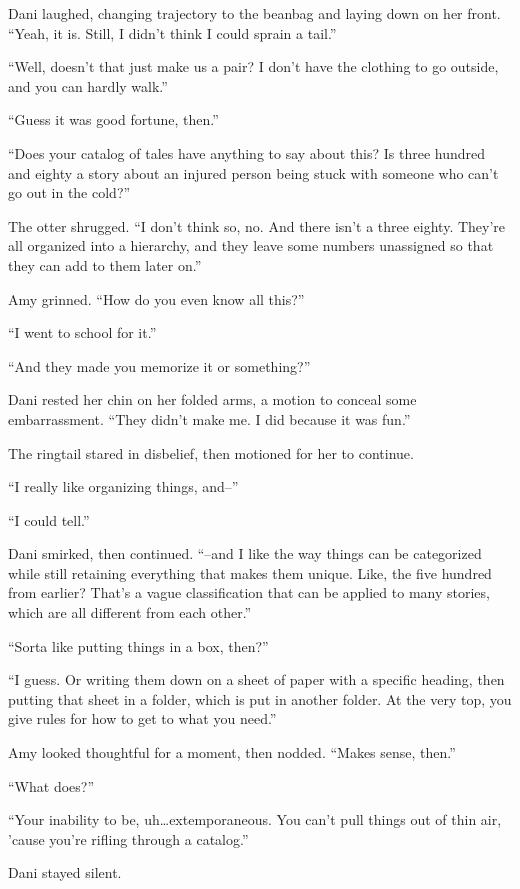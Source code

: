 Dani laughed, changing trajectory to the beanbag and laying down on her front. ``Yeah, it is. Still, I didn't think I could sprain a tail.''

``Well, doesn't that just make us a pair? I don't have the clothing to go outside, and you can hardly walk.''

``Guess it was good fortune, then.''

``Does your catalog of tales have anything to say about this? Is three hundred and eighty a story about an injured person being stuck with someone who can't go out in the cold?''

The otter shrugged. ``I don't think so, no. And there isn't a three eighty. They're all organized into a hierarchy, and they leave some numbers unassigned so that they can add to them later on.''

Amy grinned. ``How do you even know all this?''

``I went to school for it.''

``And they made you memorize it or something?''

Dani rested her chin on her folded arms, a motion to conceal some embarrassment. ``They didn't make me. I did because it was fun.''

The ringtail stared in disbelief, then motioned for her to continue.

``I really like organizing things, and--''

``I could tell.''

Dani smirked, then continued. ``--and I like the way things can be categorized while still retaining everything that makes them unique. Like, the five hundred from earlier? That's a vague classification that can be applied to many stories, which are all different from each other.''

``Sorta like putting things in a box, then?''

``I guess. Or writing them down on a sheet of paper with a specific heading, then putting that sheet in a folder, which is put in another folder. At the very top, you give rules for how to get to what you need.''

Amy looked thoughtful for a moment, then nodded. ``Makes sense, then.''

``What does?''

``Your inability to be, uh\ldots{}extemporaneous. You can't pull things out of thin air, 'cause you're rifling through a catalog.''

Dani stayed silent.

